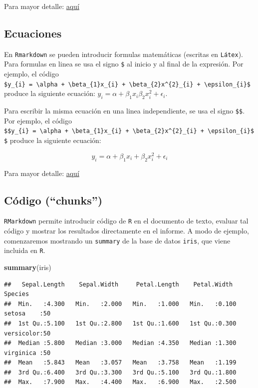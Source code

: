 \documentclass[
]{article}
\newenvironment{Shaded}{\begin{snugshade}}{\end{snugshade}}
\newcommand{\KeywordTok}[1]{\textcolor[rgb]{0.13,0.29,0.53}{\textbf{#1}}}
\newcommand{\NormalTok}[1]{#1}
\begin{document}
Para mayor detalle:
\href{https://www.markdownguide.org/cheat-sheet/}{aquí}

\hypertarget{ecuaciones}{%
\subsection{Ecuaciones}\label{ecuaciones}}

En \texttt{Rmarkdown} se pueden introducir formulas matemáticas
(escritas en \texttt{Látex}). Para formulas en linea se usa el signo
\texttt{\$} al inicio y al final de la expresión. Por ejemplo, el código
\texttt{\$y\_\{i\}\ =\ \textbackslash{}alpha\ +\ \textbackslash{}beta\_\{1\}x\_\{i\}\ +\ \textbackslash{}beta\_\{2\}x\^{}\{2\}\_\{i\}\ +\ \textbackslash{}epsilon\_\{i\}\$}
produce la siguiente ecuación:
\(y_{i} = \alpha + \beta_{1}x_{i} \beta_{2}x^{2}_{i} + \epsilon_{i}\).

Para escribir la misma ecuación en una linea independiente, se usa el
signo \texttt{\$\$}. Por ejemplo, el código
\texttt{\$\$y\_\{i\}\ =\ \textbackslash{}alpha\ +\ \textbackslash{}beta\_\{1\}x\_\{i\}\ +\ \textbackslash{}beta\_\{2\}x\^{}\{2\}\_\{i\}\ +\ \textbackslash{}epsilon\_\{i\}\$\$}
produce la siguiente ecuación:

\[y_{i} = \alpha + \beta_{1}x_{i} + \beta_{2}x^{2}_{i} + \epsilon_{i}\]

Para mayor detalle:
\href{https://en.wikibooks.org/wiki/LaTeX/Mathematics}{aquí}

\hypertarget{cuxf3digo-chunks}{%
\subsection{Código (``chunks'')}\label{cuxf3digo-chunks}}

\texttt{RMarkdown} permite introducir código de \texttt{R} en el
documento de texto, evaluar tal código y mostrar los resultados
directamente en el informe. A modo de ejemplo, comenzaremos mostrando un
\texttt{summary} de la base de datos \texttt{iris}, que viene incluida
en \texttt{R}.

\begin{Shaded}
\begin{Highlighting}[]
\KeywordTok{summary}\NormalTok{(iris)}
\end{Highlighting}
\end{Shaded}

\begin{verbatim}
##   Sepal.Length    Sepal.Width     Petal.Length    Petal.Width          Species  
##  Min.   :4.300   Min.   :2.000   Min.   :1.000   Min.   :0.100   setosa    :50  
##  1st Qu.:5.100   1st Qu.:2.800   1st Qu.:1.600   1st Qu.:0.300   versicolor:50  
##  Median :5.800   Median :3.000   Median :4.350   Median :1.300   virginica :50  
##  Mean   :5.843   Mean   :3.057   Mean   :3.758   Mean   :1.199                  
##  3rd Qu.:6.400   3rd Qu.:3.300   3rd Qu.:5.100   3rd Qu.:1.800                  
##  Max.   :7.900   Max.   :4.400   Max.   :6.900   Max.   :2.500
\end{verbatim}
\end{document}
